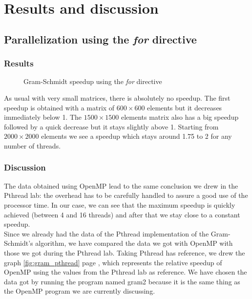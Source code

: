 \chapter{Results and discussion}

\section{Parallelization using the \textit{for} directive}

\subsection{Results}

\begin{figure}[ht]
  \begin{center}
  \end{center}
  \caption{Gram-Schmidt speedup using the \textit{for} directive}
  \label{fig:gram_speedup}
\end{figure} 

As usual with very small matrices, there is absolutely no speedup. The first speedup is obtained with a matrix of $600\times 600$ elements but it decreases immediately below 1. The $1500\times 1500$ elements matrix also has a big speedup followed by a quick decrease but it stays slightly above 1.
Starting from $2000\times 2000$ elements we see a speedup which stays around 1.75 to 2 for any number of threads.


\subsection{Discussion}

The data obtained using OpenMP lead to the same conclusion we drew in the Pthread lab: the overhead has to be carefully handled to assure a good use of the processor time. In our case, we can see that the maximum speedup is quickly achieved (between 4 and 16 threads) and after that we stay close to a constant speedup.\\

Since we already had the data of the Pthread implementation of the Gram-Schmidt's
algorithm, we have compared the data we got with OpenMP with those we got during the
Pthread lab. Taking Pthread has reference, we drew the graph \ref{fig:gram_pthread}
page \pageref{fig:gram_pthread}, which represents the relative speedup of OpenMP using the
values from the Pthread lab as reference. We have chosen the data got by running the
program named gram2 because it is the same thing as the OpenMP program we are currently discussing.

